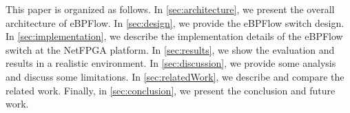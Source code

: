 This paper is organized as follows. In \textsection\ref{sec:architecture}, we present the overall architecture of eBPFlow. In \textsection\ref{sec:design}, we provide the eBPFlow switch design. In \textsection\ref{sec:implementation}, we describe the implementation details of the eBPFlow switch at the NetFPGA platform. In \textsection\ref{sec:results}, we show the evaluation and results in a realistic environment. 
In \textsection\ref{sec:discussion}, we provide some analysis and discuss some limitations.
In \textsection\ref{sec:relatedWork}, we describe and compare the related work. Finally, in \textsection\ref{sec:conclusion}, we present the conclusion and future work.
